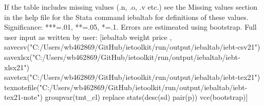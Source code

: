 If the table includes missing values (.n, .o, .v etc.) see the Missing values section in the help file for the Stata command iebaltab for definitions of these values. Significance: ***=.01, **=.05, *=.1. Errors are estimeated using bootstrap. Full user input as written by user: [iebaltab weight price , savecsv("C:/Users/wb462869/GitHub/ietoolkit/run/output/iebaltab/iebt-csv21") savexlsx("C:/Users/wb462869/GitHub/ietoolkit/run/output/iebaltab/iebt-xlsx21") savetex("C:/Users/wb462869/GitHub/ietoolkit/run/output/iebaltab/iebt-tex21") texnotefile("C:/Users/wb462869/GitHub/ietoolkit/run/output/iebaltab/iebt-tex21-note") groupvar(tmt\_cl) replace stats(desc(sd) pair(p)) vce(bootstrap)]
